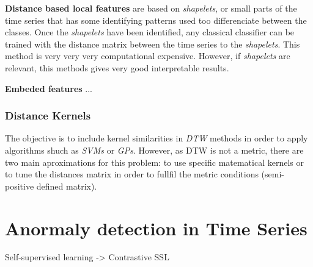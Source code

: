\textbf{Distance based local features} are based on \textit{shapelets}, or small parts of the time series that has some identifying patterns used too differenciate between the classes. Once the \textit{shapelets} have been identified, any classical classifier can be trained with the distance matrix between the time series to the \textit{shapelets}. This method is very very very computational expensive. However, if \textit{shapelets} are relevant, this methods gives very good interpretable results.

\textbf{Embeded features} ...

\subsubsection{Distance Kernels}
The objective is to include kernel similarities in \textit{DTW} methods in order to apply algorithms shuch as \textit{SVMs} or \textit{GPs}. However, as DTW is not a metric, there are two main aproximations for this problem: to use specific matematical kernels or to tune the distances matrix in order to fullfil the metric conditions (semi-positive defined matrix).

\section{Anormaly detection in Time Series}
Self-supervised learning -> Contrastive SSL




